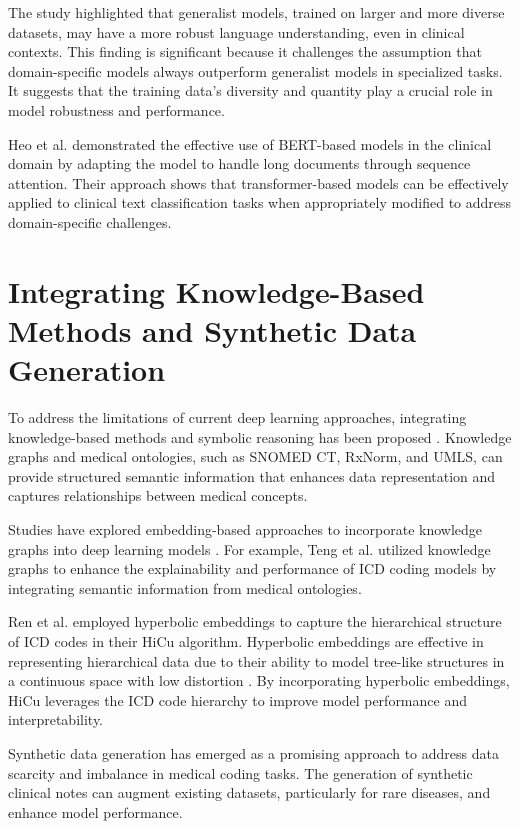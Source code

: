 \documentclass[12pt,a4paper]{report}
\begin{document}
The study highlighted that generalist models, trained on larger and more diverse datasets, may have a more robust language understanding, even in clinical contexts. This finding is significant because it challenges the assumption that domain-specific models always outperform generalist models in specialized tasks. It suggests that the training data's diversity and quantity play a crucial role in model robustness and performance.

Heo et al. \cite{heo2022medical} demonstrated the effective use of BERT-based models in the clinical domain by adapting the model to handle long documents through sequence attention. Their approach shows that transformer-based models can be effectively applied to clinical text classification tasks when appropriately modified to address domain-specific challenges.

\section{Integrating Knowledge-Based Methods and Synthetic Data Generation}

To address the limitations of current deep learning approaches, integrating knowledge-based methods and symbolic reasoning has been proposed \cite{dong2022automated}. Knowledge graphs and medical ontologies, such as SNOMED CT, RxNorm, and UMLS, can provide structured semantic information that enhances data representation and captures relationships between medical concepts.

Studies have explored embedding-based approaches to incorporate knowledge graphs into deep learning models \cite{teng2020explainable, xie2019ehr}. For example, Teng et al. \cite{teng2020explainable} utilized knowledge graphs to enhance the explainability and performance of ICD coding models by integrating semantic information from medical ontologies.

Ren et al. \cite{ren2022hicu} employed hyperbolic embeddings to capture the hierarchical structure of ICD codes in their HiCu algorithm. Hyperbolic embeddings are effective in representing hierarchical data due to their ability to model tree-like structures in a continuous space with low distortion \cite{nickel2017poincare}. By incorporating hyperbolic embeddings, HiCu leverages the ICD code hierarchy to improve model performance and interpretability.

Synthetic data generation has emerged as a promising approach to address data scarcity and imbalance in medical coding tasks. The generation of synthetic clinical notes can augment existing datasets, particularly for rare diseases, and enhance model performance.
\end{document}
